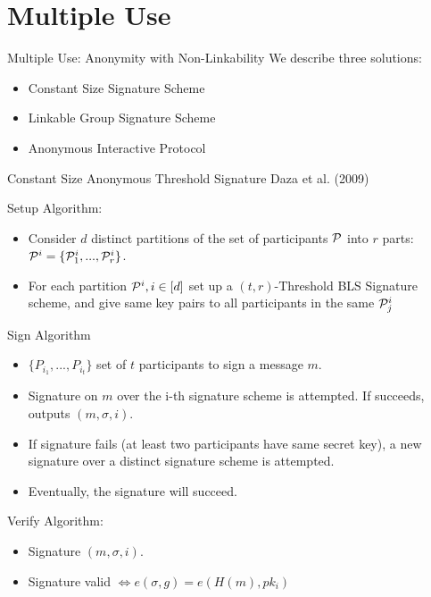 \section{Multiple Use}
\begin{frame}{Multiple Use: Anonymity with Non-Linkability}
We describe three solutions:
\begin{itemize}
\item Constant Size Signature Scheme
\item Linkable Group Signature Scheme
\item Anonymous Interactive Protocol
\end{itemize}

\end{frame}

\begin{frame}{Constant Size Anonymous Threshold Signature}
Daza et al. (2009)

Setup Algorithm:
\begin{itemize}
\item Consider $d$ distinct partitions of the set of participants ${\mathcal P}$ into $r$ parts: ${\mathcal P}^i = \{{\mathcal P}_1^i, ... , {\mathcal P}_r^i\}$.
\item For each partition ${\mathcal P}^i, i \in [d]$ set up a $(t,r)$-Threshold BLS Signature scheme, and give same key pairs to all participants in the same ${\mathcal P}_j^i$
\end{itemize}

\end{frame}

\begin{frame}
Sign Algorithm
\begin{itemize}
\item $\{ P_{i_1}, ... , P_{i_t}\}$ set of $t$ participants to sign a message $m$.
\item Signature on $m$ over the i-th signature scheme is attempted. If succeeds, outputs $(m,\sigma,i)$.
\item If signature fails (at least two participants have same secret key), a new signature over a distinct signature scheme is attempted.
\item Eventually, the signature will succeed.
\end{itemize}

\end{frame}

\begin{frame}
Verify Algorithm:
\begin{itemize}
\item Signature $(m,\sigma,i)$.
\item Signature valid $\Leftrightarrow e(\sigma,g) = e(H(m),pk_i)$
\end{itemize}
\end{frame}

